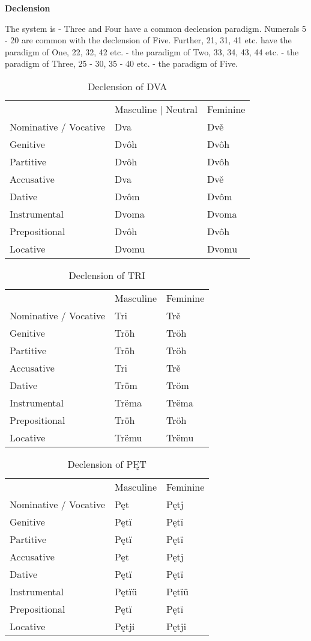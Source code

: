 \textbf{Declension}

The system is - Three and Four have a common declension paradigm. Numerals 5 - 20 are common with the declension of Five. Further, 21, 31, 41 etc. have the paradigm of One, 22, 32, 42 etc. - the paradigm of Two, 33, 34, 43, 44 etc. - the paradigm of Three, 25 - 30, 35 - 40 etc. - the paradigm of Five.

\begin{table}[!htb]
	\caption{Declension of DVA}
	\begin{tabular}{lll}
		& Masculine | Neutral & Feminine \\
		Nominative / Vocative & Dva & Dvě \\
		Genitive & Dvôh & Dvôh \\
		Partitive & Dvôh & Dvôh \\
		Accusative & Dva & Dvě \\
		Dative & Dvôm & Dvôm \\
		Instrumental & Dvoma & Dvoma \\
		Prepositional & Dvôh & Dvôh \\
		Locative & Dvomu & Dvomu \\
	\end{tabular}
\end{table}

\begin{table}[!htb]
	\caption{Declension of TRI}
	\begin{tabular}{lll}
		& Masculine & Feminine \\
		Nominative / Vocative & Tri & Trě \\
		Genitive & Tröh & Tröh \\
		Partitive & Tröh & Tröh \\
		Accusative & Tri & Trě \\
		Dative & Tröm & Tröm \\
		Instrumental & Trëma & Trëma \\
		Prepositional & Tröh & Tröh \\
		Locative & Trëmu & Trëmu \\
	\end{tabular}
\end{table}

\begin{table}
	\caption{Declension of PĘT}
	\begin{tabular}{lll}
		& Masculine & Feminine \\
		Nominative / Vocative & Pęt & Pętj \\
		Genitive & Pętï & Pętï \\
		Partitive & Pętï & Pętï \\
		Accusative & Pęt & Pętj \\
		Dative & Pętï & Pętï \\
		Instrumental & Pętïü & Pętïü \\
		Prepositional & Pętï & Pętï \\
		Locative & Pętji & Pętji \\
	\end{tabular}
\end{table}



